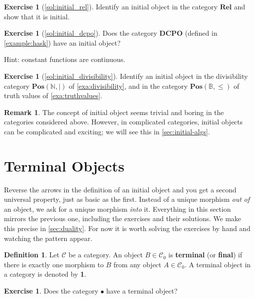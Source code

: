 \documentclass[a4paper,11pt, oneside,titlepage=false]{scrbook}
\theoremstyle{plain}
\theoremstyle{definition}
\newtheorem{rem}[thm]{Remark}
\newtheorem{dfn}[thm]{Definition}
\newtheorem{exer}[thm]{Exercise}
\newcommand{\Cat}[1]{\mathcal{#1}}
\newcommand{\CC}{\Cat{C}}
\newcommand{\Catb}[1]{\mathbf{#1}}
\newcommand{\POS}{\Catb{Pos}}
\newcommand{\DCPO}{\Catb{DCPO}}
\newcommand{\REL}{\Catb{Rel}}
\newcommand{\Ob}[1]{{#1}_0}
\newcommand{\NN}{\ensuremath{\mathbb{N}}}
\begin{document}
\begin{exer}[\cref{sol:initial_rel}] \label{exer:initial_rel}
Identify an initial object in the category $\REL$ and show that it is initial.
\end{exer}

\begin{exer}[\cref{sol:initial_dcpo}]\label{exer:initial_dcpo}
  Does the category $\DCPO$ (defined in \cref{example:hask}) have an initial object?

  Hint: constant functions are continuous.
\end{exer}

\begin{exer}[\cref{sol:initial_divisibility}]\label{exer:initial_divisibility}
  Identify an initial object in the divisibility category $\POS(\NN, \mid)$ of
  \cref{exa:divisibility}, and in the category $\POS(\mathbb{B}, \leq)$ of
  truth values of \cref{exa:truthvalues}.
\end{exer}

\begin{rem}
  The concept of initial object seems trivial and boring in the categories considered above.
  However, in complicated categories, initial objects can be complicated and exciting;
  we will see this in \cref{sec:initial-algs}.
\end{rem}

\section{Terminal Objects}
\label{sec:terminal-objects}

Reverse the arrows in the definition of an initial object and you get a second
universal property, just as basic as the first.
Instead of a unique morphism \emph{out of} an object, we ask for a unique
morphism \emph{into} it.
Everything in this section mirrors the previous one, including the exercises
and their solutions.
We make this precise in \cref{sec:duality}.
For now it is worth solving the exercises by hand and watching the pattern
appear.

\begin{dfn}
  Let $\CC$ be a category. An object $B \in \Ob{\CC}$ is \textbf{terminal} (or \textbf{final}) if there is exactly one morphism to $B$ from any object $A \in \Ob{\CC}$.
  A terminal object in a category is denoted by \textbf{1}.
\end{dfn}

\begin{exer}
  Does the category $\bullet$ have a terminal object?
\end{exer}
\end{document}
